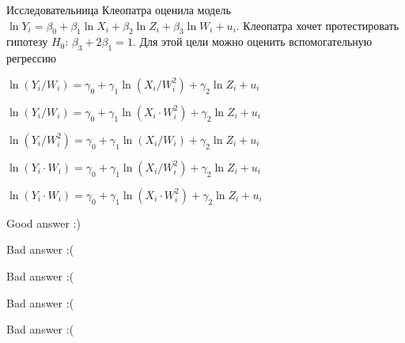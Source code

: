 
\begin{question}
Исследовательница Клеопатра оценила модель \(\ln Y_i = \beta_0 + \beta_1 \ln X_i + \beta_2 \ln Z_i + \beta_3 \ln W_i + u_i\).
Клеопатра хочет протестировать гипотезу \(H_0\): \(\beta_3 + 2\beta_1 = 1\).
Для этой цели можно оценить вспомогательную регрессию
\begin{answerlist}
  \item \(\ln(Y_i/W_i) = \gamma_0 + \gamma_1 \ln(X_i/W_i^2) + \gamma_2 \ln{Z_i} + u_i\)
  \item \(\ln(Y_i/W_i) = \gamma_0 + \gamma_1 \ln (X_i \cdot W_i^2) + \gamma_2 \ln Z_i + u_i\)
  \item \(\ln(Y_i/W_i^2) = \gamma_0 + \gamma_1 \ln (X_i/W_i) + \gamma_2 \ln Z_i + u_i\)
  \item \(\ln(Y_i \cdot W_i) = \gamma_0 + \gamma_1 \ln (X_i/W_i^2) + \gamma_2 \ln Z_i + u_i\)
  \item \(\ln(Y_i \cdot W_i) = \gamma_0 + \gamma_1 \ln (X_i \cdot W_i^2) + \gamma_2 \ln Z_i + u_i\)
\end{answerlist}
\end{question}

\begin{solution}
\begin{answerlist}
  \item Good answer :)
  \item Bad answer :(
  \item Bad answer :(
  \item Bad answer :(
  \item Bad answer :(
\end{answerlist}
\end{solution}

